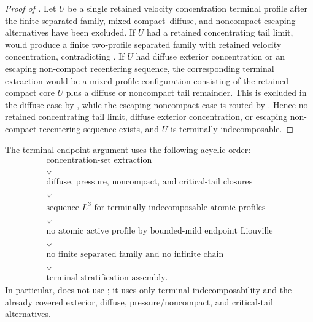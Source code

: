 \documentclass[11pt]{amsart}
\numberwithin{equation}{section}
\theoremstyle{plain}
\theoremstyle{definition}
\theoremstyle{remark}
\begin{document}
\begin{proof}[Proof of ]
Let \(U\) be a single retained velocity concentration terminal profile after the finite
separated-family, mixed compact--diffuse, and noncompact escaping alternatives
have been excluded.  If \(U\) had a retained concentrating tail limit,
 would produce a finite two-profile
separated family with retained velocity concentration, contradicting
.  If \(U\) had diffuse exterior
concentration or an escaping non-compact recentering sequence, the corresponding
terminal extraction would be a mixed profile configuration consisting of the
retained compact core \(U\) plus a diffuse or noncompact tail remainder.  This
is excluded in the diffuse case by , while
the escaping noncompact case is routed by
.  Hence no retained
concentrating tail limit, diffuse exterior concentration, or escaping
non-compact recentering sequence exists, and \(U\) is terminally
indecomposable.
\end{proof}

The terminal endpoint argument uses the following acyclic order:
\[
\begin{array}{c}
\text{concentration-set extraction}\\
\Downarrow\\
\text{diffuse, pressure, noncompact, and critical-tail closures}\\
\Downarrow\\
\text{sequence-}L^3\text{ for terminally indecomposable atomic profiles}\\
\Downarrow\\
\text{no atomic active profile by bounded-mild endpoint Liouville}\\
\Downarrow\\
\text{no finite separated family and no infinite chain}\\
\Downarrow\\
\text{terminal stratification assembly.}
\end{array}
\]
In particular,  does not use
; it uses only terminal indecomposability and
the already covered exterior, diffuse, pressure/noncompact, and critical-tail
alternatives.
\end{document}
